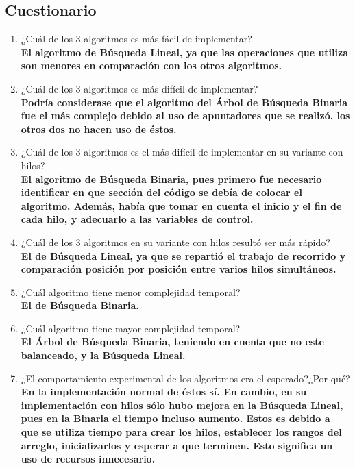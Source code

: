 \documentclass[12pt]{article}
\begin{document}
		\subsection{Cuestionario}
		\begin{enumerate}
			        \item ¿Cuál de los 3 algoritmos es más fácil de implementar?\\
			        \textbf{El algoritmo de Búsqueda Lineal, ya que las operaciones que utiliza son menores en comparación con los otros algoritmos.}
			        
			        \item ¿Cuál de los 3 algoritmos es más difícil de implementar?\\
			        \textbf{Podría considerase que el algoritmo del Árbol de Búsqueda Binaria fue el más complejo debido al uso de apuntadores que se realizó, los otros dos no hacen uso de éstos.}
			        
			        \item ¿Cuál de los 3 algoritmos es el más difícil de implementar en su variante con hilos?\\
			        \textbf{El algoritmo  de Búsqueda Binaria, pues primero fue necesario identificar en que sección del código se debía de colocar el algoritmo. Además, había que tomar en cuenta el inicio y el fin de cada hilo, y adecuarlo a las variables de control.}
			        
			        \item ¿Cuál de los 3 algoritmos en su variante con hilos resultó ser más rápido?\\
			        \textbf{El de Búsqueda Lineal, ya que se repartió el trabajo de recorrido y comparación posición por posición entre varios hilos simultáneos.}
			        
			        \item ¿Cuál algoritmo tiene menor complejidad temporal?\\
	                \textbf{El de Búsqueda Binaria.}
			        
			        \item ¿Cuál algoritmo tiene mayor complejidad temporal?\\
			        \textbf{El Árbol de Búsqueda Binaria, teniendo en cuenta que no este balanceado, y la Búsqueda Lineal.}
			        \item ¿El comportamiento experimental de los algoritmos era el esperado?¿Por qué?\\
			        \textbf{En la implementación normal de éstos sí. En cambio, en su implementación con hilos sólo hubo mejora en la Búsqueda Lineal, pues en la Binaria el tiempo incluso aumento. Estos es debido a que se utiliza tiempo para crear los hilos, establecer los rangos del arreglo, inicializarlos y esperar a que terminen. Esto significa un uso de recursos innecesario.}
			        

\end{enumerate}
\end{document}
